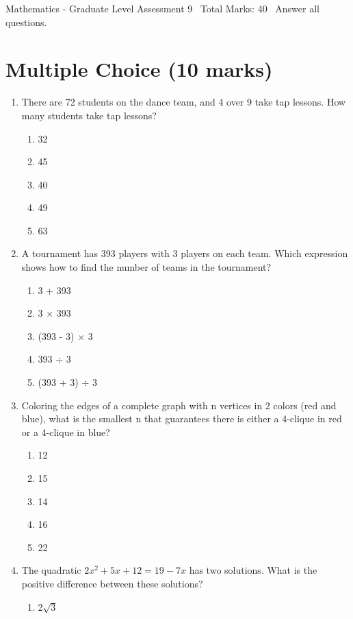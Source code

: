 \documentclass[12pt]{article}
\begin{document}
\begin{center}
Mathematics - Graduate Level Assessment 9 \
Total Marks: 40 \
Answer all questions.
\end{center}

\section*{Multiple Choice (10 marks)}
\begin{enumerate}[label=\arabic*.]
\item There are 72 students on the dance team, and 4 over 9 take tap lessons. How many students take tap lessons?
\begin{enumerate}[label=(\alph*)]
    \item 32
    \item 45
    \item 40
    \item 49
    \item 63
\end{enumerate}
\item A tournament has 393 players with 3 players on each team. Which expression shows how to find the number of teams in the tournament?
\begin{enumerate}[label=(\alph*)]
    \item 3 + 393
    \item 3 \ensuremath{\times} 393
    \item (393 - 3) \ensuremath{\times} 3
    \item 393 \ensuremath{\div} 3
    \item (393 + 3) \ensuremath{\div} 3
\end{enumerate}
\item Coloring the edges of a complete graph with n vertices in 2 colors (red and blue), what is the smallest n that guarantees there is either a 4-clique in red or a 4-clique in blue?
\begin{enumerate}[label=(\alph*)]
    \item 12
    \item 15
    \item 14
    \item 16
    \item 22
\end{enumerate}
\item The quadratic $2 x^2+5 x+12=19-7 x$ has two solutions. What is the positive difference between these solutions?
\begin{enumerate}[label=(\alph*)]
    \item 2\ensuremath{\sqrt{3}}

\end{enumerate}
\end{enumerate}
\end{document}
